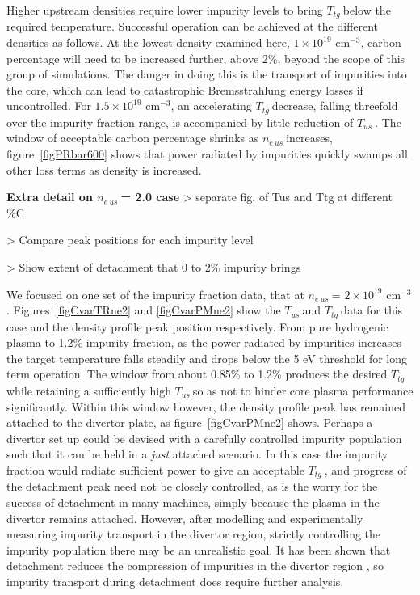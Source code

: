 \documentclass[12pt]{article}  %
\providecommand{\noNe}[1]{{${#1}\times 10^{19}$ cm$^{-3}$}} %
\providecommand{\neus}{$n_{e~us}~$} %
\providecommand{\Tus}{$T_{us}~$} %
\providecommand{\Ttg}{$T_{tg}~$} %
\begin{document}
Higher upstream densities require lower impurity levels to bring \Ttg below the required temperature. Successful operation can be achieved at the different densities as follows. At the lowest density examined here, \noNe{1}, carbon percentage will need to be increased further, above 2\%, beyond the scope of this group of simulations. The danger in doing this is the transport of impurities into the core, which can lead to catastrophic Bremsstrahlung energy losses if uncontrolled. For \noNe{1.5}, an accelerating \Ttg decrease, falling threefold over the impurity fraction range, is accompanied by little reduction of \Tus. The window of acceptable carbon percentage shrinks as \neus increases, figure~\ref{figPRbar600} shows that power radiated by impurities quickly swamps all other loss terms as density is increased.



\textbf{Extra detail on \neus = 2.0 case}
> separate fig. of Tus and Ttg at different \%C 

> Compare peak positions for each impurity level

> Show extent of detachment that 0 to 2\% impurity brings

We focused on one set of the impurity fraction data, that at \neus = \noNe{2}. Figures~\ref{figCvarTRne2} and \ref{figCvarPMne2} show the \Tus and \Ttg data for this case and the density profile peak position respectively. From pure hydrogenic plasma to 1.2\% impurity fraction, as the power radiated by impurities increases the target temperature falls steadily and drops below the 5 eV threshold for long term operation. The window from about 0.85\% to 1.2\% produces the desired \Ttg while retaining a sufficiently high \Tus so as not to hinder core plasma performance significantly. Within this window however, the density profile peak has remained attached to the divertor plate, as figure~\ref{figCvarPMne2} shows. Perhaps a divertor set up could be devised with a carefully controlled impurity population such that it can be held in a \textit{just} attached scenario. In this case the impurity fraction would radiate sufficient power to give an acceptable \Ttg, and progress of the detachment peak need not be closely controlled, as is the worry for the success of detachment in many machines, simply because the plasma in the divertor remains attached. However, after modelling and experimentally measuring impurity transport in the divertor region, strictly controlling the impurity population there may be an unrealistic goal. It has been shown that detachment reduces the compression of impurities in the divertor region \cite{Bosch2001}, so impurity transport during detachment does require further analysis.
\end{document}
